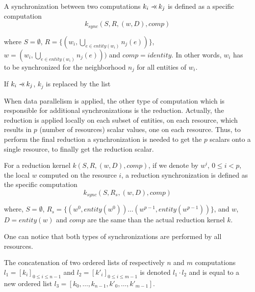 \begin{mydef}
A synchronization between two computations $k_i \pprec k_j$ is defined as a specific computation 
\begin{equation*}
k_{sync}(S,R,(w,D),comp)
\end{equation*}
\end{mydef}
where $S=\emptyset$, $R=\{(w_i,\bigcup_{e \in entity(w_i)} n_j(e))\}$, $w=(w_i,\bigcup_{e \in entity(w_i)} n_j(e)))$ and $comp=identity$. In other words, $w_i$ has to be synchronized for the neighborhood $n_j$ for all entities of $w_i$.

\begin{mydef}
If $k_i \pprec k_j$, $k_j$ is replaced by the list
\begin{equation*}
[k_{sync}(\emptyset,\{(w_i,n_j)\},(w_i,n_j),identity), k_j]
\end{equation*}
\end{mydef}

When data parallelism is applied, the other type of computation which is responsible for additional synchronizations is the reduction. Actually, the reduction is applied locally on each subset of entities, on each resource, which results in $p$ (number of resources) scalar values, one on each resource. Thus, to perform the final reduction a synchronization is needed to get the $p$ scalars onto a single resource, to finally get the reduction scalar.

\begin{mydef}
For a reduction kernel $k(S,R,(w,D),comp)$, if we denote by $w^i$, $0 \leq i<p$, the local $w$ computed on the resource $i$, a reduction synchronization is defined as the specific computation 
\begin{equation*}
k_{sync}(S,R_s,(w,D),comp)
\end{equation*}
\end{mydef}
where, $S=\emptyset$, $R_s=\{(w^0,entity(w^0)) \dots (w^{p-1},entity(w^{p-1}))\}$, and $w$, $D=entity(w)$ and $comp$ are the same than the actual reduction kernel $k$.

One can notice that both types of synchronizations are performed by all resources.

\begin{mydef}
The concatenation of two ordered lists of respectively $n$ and $m$ computations $l_1=[k_i]_{0 \leq i \leq n-1}$ and $l_2=[k'_i]_{0 \leq i \leq m-1}$ is denoted $l_1 \cdot l_2$ and is equal to a new ordered list $l_3=[k_0,\dots,k_{n-1},k'_0,\dots,k'_{m-1}]$.
\end{mydef}

